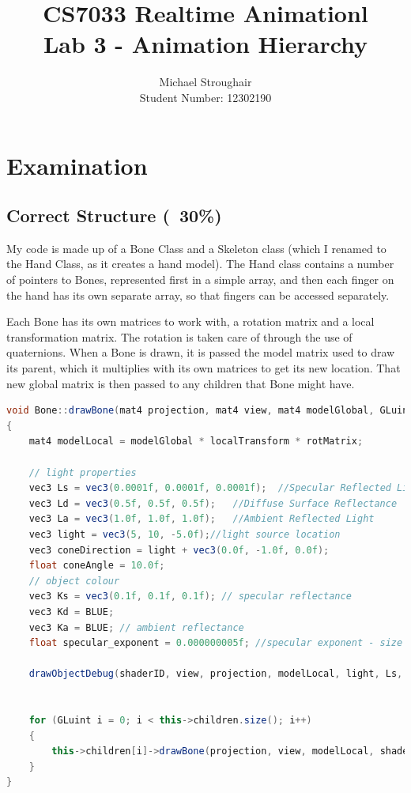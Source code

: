 \documentclass{article}
\title{CS7033 Realtime Animationl \\ Lab 3 - Animation Hierarchy}
\author{Michael Stroughair \\Student Number: 12302190}
\begin{document}
\maketitle

\section{Examination}

\subsection{Correct Structure (~30\%)}

My code is made up of a Bone Class and a Skeleton class (which I renamed to the Hand Class, as it creates a hand model). The Hand class contains a number of pointers to Bones, represented first in a simple array, and then each finger on the hand has its own separate array, so that fingers can be accessed separately.

Each Bone has its own matrices to work with, a rotation matrix and a local transformation matrix. The rotation is taken care of through the use of quaternions. When a Bone is drawn, it is passed the model matrix used to draw its parent, which it multiplies with its own matrices to get its new location. That new global matrix is then passed to any children that Bone might have.

\begin{lstlisting}[language=Java]
void Bone::drawBone(mat4 projection, mat4 view, mat4 modelGlobal, GLuint shaderID, EulerCamera cam)
{
	mat4 modelLocal = modelGlobal * localTransform * rotMatrix;

	// light properties
	vec3 Ls = vec3(0.0001f, 0.0001f, 0.0001f);	//Specular Reflected Light
	vec3 Ld = vec3(0.5f, 0.5f, 0.5f);	//Diffuse Surface Reflectance
	vec3 La = vec3(1.0f, 1.0f, 1.0f);	//Ambient Reflected Light
	vec3 light = vec3(5, 10, -5.0f);//light source location
	vec3 coneDirection = light + vec3(0.0f, -1.0f, 0.0f);
	float coneAngle = 10.0f;
	// object colour
	vec3 Ks = vec3(0.1f, 0.1f, 0.1f); // specular reflectance
	vec3 Kd = BLUE;
	vec3 Ka = BLUE; // ambient reflectance
	float specular_exponent = 0.000000005f; //specular exponent - size of the specular elements

	drawObjectDebug(shaderID, view, projection, modelLocal, light, Ls, La, Ld, Ks, Kd, Ka, specular_exponent, cam, mesh, coneAngle, coneDirection, GL_TRIANGLES);
	
	
	for (GLuint i = 0; i < this->children.size(); i++)
	{
		this->children[i]->drawBone(projection, view, modelLocal, shaderID, cam);
	}
}
\end{lstlisting}
\end{document}
